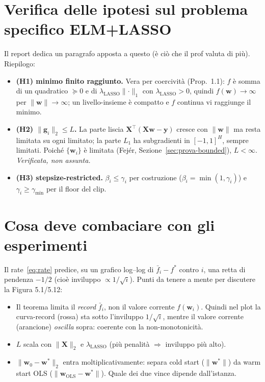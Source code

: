 \documentclass[11pt,a4paper]{article}
\theoremstyle{definition}
\newcommand{\w}{\bm{w}}
\newcommand{\X}{\bm{X}}
\newcommand{\y}{\bm{y}}
\newcommand{\g}{\bm{g}}
\newcommand{\wstar}{\w^{*}}
\newcommand{\fstar}{f^{*}}
\newcommand{\fbar}{\bar{f}}
\newcommand{\gmin}{\gamma_{\min}}
\newcommand{\norm}[1]{\lVert #1\rVert}
\newcommand{\lasso}{\lambda_{\mathrm{LASSO}}}
\begin{document}
\section{Verifica delle ipotesi sul problema specifico ELM+LASSO}
\label{sec:verifica}

Il report dedica un paragrafo apposta a questo (è ciò che il prof valuta di più). Riepilogo:
\begin{itemize}[leftmargin=1.4em]
\item \textbf{(H1) minimo finito raggiunto.} Vera per coercività (Prop.~1.1): $f$ è somma di
un quadratico $\succeq0$ e di $\lasso\norm{\cdot}_1$ con $\lasso>0$, quindi
$f(\w)\to\infty$ per $\norm{\w}\to\infty$; un livello-insieme è compatto e $f$ continua vi
raggiunge il minimo.
\item \textbf{(H2) $\norm{\g_i}_2\le L$.} La parte liscia $\X^\top(\X\w-\y)$ cresce con
$\norm{\w}$ ma resta limitata su ogni limitato; la parte $L_1$ ha subgradienti in $[-1,1]^H$,
sempre limitati. Poiché $\{\w_i\}$ è limitata (Fej\'er, Sezione~\ref{sec:prova-bounded}),
$L<\infty$. \emph{Verificata, non assunta.}
\item \textbf{(H3) stepsize-restricted.} $\beta_i\le\gamma_i$ per costruzione
($\beta_i=\min(1,\gamma_i)$) e $\gamma_i\ge\gmin$ per il floor del clip.
\end{itemize}

\section{Cosa deve combaciare con gli esperimenti}
\label{sec:esperimenti}

Il rate~\eqref{eq:rate} predice, su un grafico log--log di $\fbar_i-\fstar$ contro $i$, una
retta di pendenza $-1/2$ (cioè inviluppo $\propto 1/\sqrt{i}$). Punti da tenere a mente per
discutere la Figura 5.1/5.12:
\begin{itemize}[leftmargin=1.4em]
\item Il teorema limita il \emph{record} $\fbar_i$, non il valore corrente $f(\w_i)$. Quindi
nel plot la curva-record (rossa) sta sotto l'inviluppo $1/\sqrt{i}$, mentre il valore corrente
(arancione) \emph{oscilla} sopra: coerente con la non-monotonicità.
\item $L$ scala con $\norm{\X}_2$ e $\lasso$ (più penalità $\Rightarrow$ inviluppo più alto).
\item $\norm{\w_0-\wstar}_2$ entra moltiplicativamente: separa cold start ($\norm{\wstar}$) da
warm start OLS ($\norm{\w_{\mathrm{OLS}}-\wstar}$). Quale dei due vince dipende dall'istanza.
\end{itemize}
\end{document}
